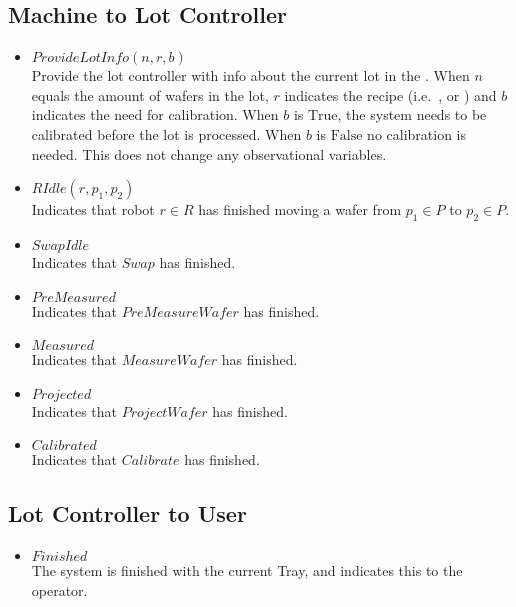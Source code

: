 \subsection{Machine to Lot Controller}
\begin{itemize}
    \item $\mathit{ProvideLotInfo}(n, r, b)$ \\
    Provide the lot controller with info about the current lot in the \tray.
    When $n$ equals the amount of wafers in the lot, $r$ indicates the recipe (i.e.\ \recipeOne, \recipeTwo or \recipeThree) and $b$ indicates the need for calibration.
    When $b$ is $\text{True}$, the system needs to be calibrated before the lot is processed.
    When $b$ is $\text{False}$ no calibration is needed.
    This does not change any observational variables.

    \item $\mathit{RIdle(r, p_1, p_2)}$ \\
    Indicates that robot $r \in R$ has finished moving a wafer from $p_1 \in P$ to $p_2 \in P$.
    
    \item $\mathit{SwapIdle}$ \\
    Indicates that $\mathit{Swap}$ has finished.

    \item $\mathit{PreMeasured}$ \\
    Indicates that $\mathit{PreMeasureWafer}$ has finished.

    \item $\mathit{Measured}$ \\
    Indicates that $\mathit{MeasureWafer}$ has finished.

    \item $\mathit{Projected}$ \\
    Indicates that $\mathit{ProjectWafer}$ has finished.

    \item $\mathit{Calibrated}$ \\
    Indicates that $\mathit{Calibrate}$ has finished.

\end{itemize}

\subsection{Lot Controller to User}
\begin{itemize}
    \item $\mathit{Finished}$ \\
    The system is finished with the current Tray, and indicates this to the operator.
\end{itemize}